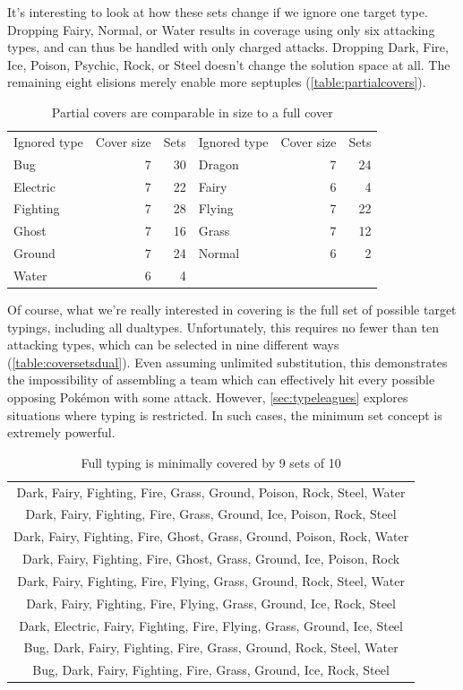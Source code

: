 It's interesting to look at how these sets change if we ignore one target type.
Dropping Fairy, Normal, or Water results in coverage using only six attacking types,
  and can thus be handled with only charged attacks.
Dropping Dark, Fire, Ice, Poison, Psychic, Rock, or Steel doesn't change the solution space at all.
The remaining eight elisions merely enable more septuples (\autoref{table:partialcovers}).
\begin{table}
\centering
  \begin{tabular}{lrr|lrr}
    Ignored type & Cover size & Sets & Ignored type & Cover size & Sets\\
    \Midrule
    Bug & 7 & 30 & Dragon & 7 & 24\\
    Electric & 7 & 22 & Fairy & 6 & 4\\
    Fighting & 7 & 28 & Flying & 7 & 22\\
    Ghost & 7 & 16 & Grass & 7 & 12\\
    Ground & 7 & 24 & Normal & 6 & 2\\
    Water & 6 & 4 & & & \\
  \end{tabular}
  \caption{Partial covers are comparable in size to a full cover\label{table:partialcovers}}
\end{table}

Of course, what we're really interested in covering is the full set
  of possible target typings, including all dualtypes.
Unfortunately, this requires no fewer than ten attacking types,
  which can be selected in nine different ways (\autoref{table:coversetsdual}).
Even assuming unlimited substitution, this demonstrates the
  impossibility of assembling a team which can effectively
  hit every possible opposing Pokémon with some attack.
However, \autoref{sec:typeleagues} explores situations where typing is restricted.
In such cases, the minimum set concept is extremely powerful.

\begin{table}
  \centering
  \begin{tabular}{c}
 Dark, Fairy, Fighting, Fire, Grass, Ground, Poison, Rock, Steel, Water\\
 Dark, Fairy, Fighting, Fire, Grass, Ground, Ice, Poison, Rock, Steel\\
 Dark, Fairy, Fighting, Fire, Ghost, Grass, Ground, Poison, Rock, Water\\
 Dark, Fairy, Fighting, Fire, Ghost, Grass, Ground, Ice, Poison, Rock\\
 Dark, Fairy, Fighting, Fire, Flying, Grass, Ground, Rock, Steel, Water\\
 Dark, Fairy, Fighting, Fire, Flying, Grass, Ground, Ice, Rock, Steel\\
 Dark, Electric, Fairy, Fighting, Fire, Flying, Grass, Ground, Ice, Steel\\
 Bug, Dark, Fairy, Fighting, Fire, Grass, Ground, Rock, Steel, Water\\
 Bug, Dark, Fairy, Fighting, Fire, Grass, Ground, Ice, Rock, Steel\\
  \end{tabular}
  \caption{Full typing is minimally covered by 9 sets of 10\label{table:coversetsdual}}
\end{table}

